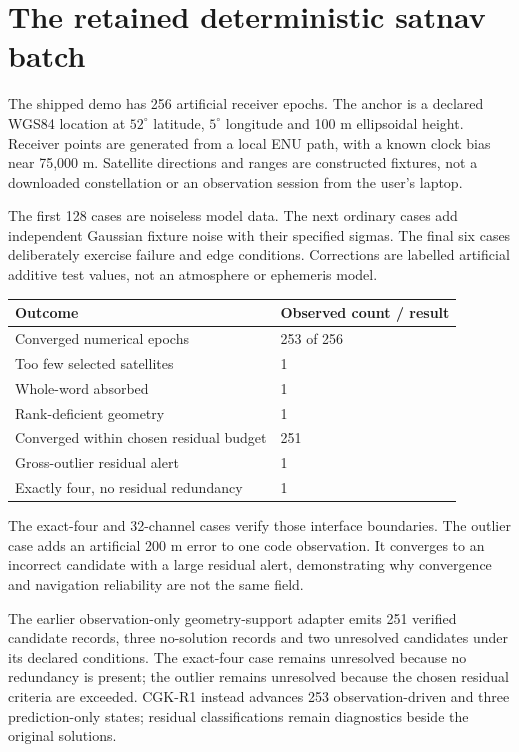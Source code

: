 \section{The retained deterministic satnav batch}
The shipped demo has 256 artificial receiver epochs. The anchor is a declared WGS84
location at $52^\circ$ latitude, $5^\circ$ longitude and 100 m ellipsoidal height.
Receiver points are generated from a local ENU path, with a known clock bias near
75,000 m. Satellite directions and ranges are constructed fixtures, not a downloaded
constellation or an observation session from the user's laptop.

The first 128 cases are noiseless model data. The next ordinary cases add independent
Gaussian fixture noise with their specified sigmas. The final six cases deliberately
exercise failure and edge conditions. Corrections are labelled artificial additive
test values, not an atmosphere or ephemeris model.

\begin{center}
\begin{tabularx}{\textwidth}{@{}P{.42\textwidth}Y@{}}\toprule
\textbf{Outcome} & \textbf{Observed count / result}\\\midrule
Converged numerical epochs & 253 of 256\\
Too few selected satellites & 1\\
Whole-word absorbed & 1\\
Rank-deficient geometry & 1\\
Converged within chosen residual budget & 251\\
Gross-outlier residual alert & 1\\
Exactly four, no residual redundancy & 1\\\bottomrule
\end{tabularx}
\end{center}

The exact-four and 32-channel cases verify those interface boundaries. The outlier
case adds an artificial 200 m error to one code observation. It converges to an
incorrect candidate with a large residual alert, demonstrating why convergence and
navigation reliability are not the same field.

The earlier observation-only geometry-support adapter emits 251 verified candidate
records, three no-solution records and two unresolved candidates under its declared
conditions. The exact-four case remains unresolved because no redundancy is present;
the outlier remains unresolved because the chosen residual criteria are exceeded.
CGK-R1 instead advances 253 observation-driven and three prediction-only states;
residual classifications remain diagnostics beside the original solutions.

